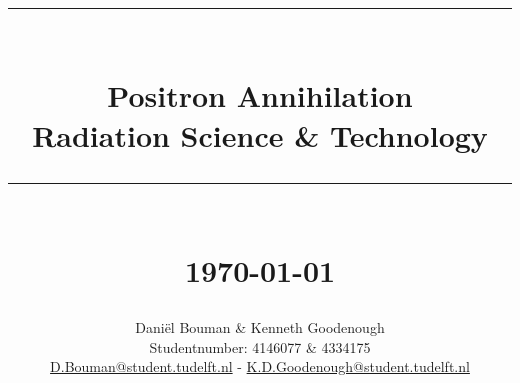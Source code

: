 %

\setlength{\oddsidemargin}{0mm}												%
\setlength{\evensidemargin}{0mm}



\newcommand{\HRuleThin}[1]{\rule{0.85\linewidth}{#1}} 	%
\newcommand{\HRuleThick}[1]{\rule{0.95\linewidth}{#1}} 	%

\makeatletter							%
\def\printtitle{%
    {\center \@title\par}}
\makeatother									

\makeatletter							%
\def\printauthor{%
    {\center \large \@author}}				
\makeatother							

\vspace*{15mm}

\title{	\small \textsc{ } 	%
			\HRuleThin{0.5pt} \\
			\vspace*{-1.8mm}								%
			\LARGE\textbf{Positron Annihilation\\ \large Radiation Science \& Technology}%
			\vspace*{-4.3mm}	%
			\HRuleThick{1.3pt} \\ [0.2mm]							%
			\normalsize \centerfloat \datekennethstyle\today			%
		}



\author{ 
		\vspace*{5mm}
		\footnotesize
		Dani\"el Bouman \& Kenneth Goodenough\\
		Studentnumber: 4146077 \& 4334175\\	
     \href{mailto:D.Bouman@student.tudelft.nl}{D.Bouman@student.tudelft.nl} - \href{mailto:K.D.Goodenough@student.tudelft.nl}{K.D.Goodenough@student.tudelft.nl} \\
\vspace*{-4mm}
}


